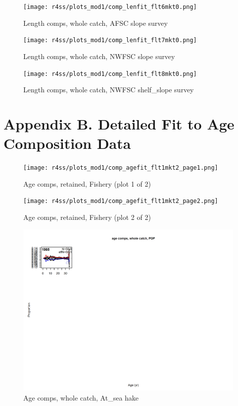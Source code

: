 \documentclass[12pt,]{article}
\begin{document}
\begin{figure}
\centering
\texttt{[image: r4ss/plots\_mod1/comp\_lenfit\_flt6mkt0.png]}
\caption{Length comps, whole catch, AFSC slope survey
\label{fig:length_fits}}
\end{figure}

\begin{figure}
\centering
\texttt{[image: r4ss/plots\_mod1/comp\_lenfit\_flt7mkt0.png]}
\caption{Length comps, whole catch, NWFSC slope survey
\label{fig:length_fits}}
\end{figure}

\begin{figure}
\centering
\texttt{[image: r4ss/plots\_mod1/comp\_lenfit\_flt8mkt0.png]}
\caption{Length comps, whole catch, NWFSC shelf\_slope survey
\label{fig:length_fits}}
\end{figure}

\FloatBarrier

\section{Appendix B. Detailed Fit to Age Composition
Data}\label{appendix-b.-detailed-fit-to-age-composition-data}

\begin{figure}
\centering
\texttt{[image: r4ss/plots\_mod1/comp\_agefit\_flt1mkt2\_page1.png]}
\caption{Age comps, retained, Fishery (plot 1 of 2)
\label{fig:age_fits}}
\end{figure}

\begin{figure}
\centering
\texttt{[image: r4ss/plots\_mod1/comp\_agefit\_flt1mkt2\_page2.png]}
\caption{Age comps, retained, Fishery (plot 2 of 2)
\label{fig:age_fits}}
\end{figure}

\begin{figure}
\centering
\includegraphics{r4ss/plots_mod1/comp_agefit_flt2mkt0.png}
\caption{Age comps, whole catch, At\_sea hake \label{fig:age_fits}}
\end{figure}
\end{document}
